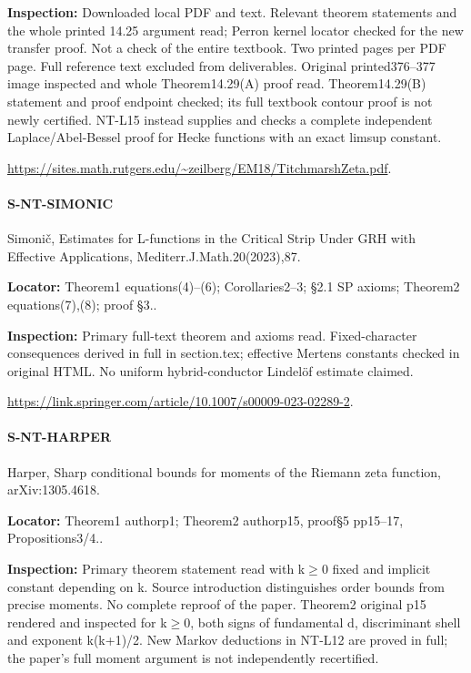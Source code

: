 \documentclass[11pt,a4paper]{article}
\begin{document}
\textbf{Inspection:} Downloaded local PDF and text.\allowbreak{} Relevant theorem statements and the whole printed 14.\allowbreak{}25 argument read; Perron kernel locator checked for the new transfer proof.\allowbreak{} Not a check of the entire textbook.\allowbreak{} Two printed pages per PDF page.\allowbreak{} Full reference text excluded from deliverables.\allowbreak{} Original printed376–\allowbreak{}377 image inspected and whole Theorem14.\allowbreak{}29(A) proof read.\allowbreak{} Theorem14.\allowbreak{}29(B) statement and proof endpoint checked; its full textbook contour proof is not newly certified.\allowbreak{} NT-L15 instead supplies and checks a complete independent Laplace/\allowbreak{}Abel-Bessel proof for Hecke functions with an exact limsup constant.\allowbreak{}

\url{https://sites.math.rutgers.edu/~zeilberg/EM18/TitchmarshZeta.pdf}.

\paragraph{S-NT-SIMONIC} Simonič, Estimates for L-functions in the Critical Strip Under GRH with Effective Applications, Mediterr.\allowbreak{}J.\allowbreak{}Math.\allowbreak{}20(2023),87.

\textbf{Locator:} Theorem1 equations(4)–\allowbreak{}(6); Corollaries2–\allowbreak{}3; §2.\allowbreak{}1 SP axioms; Theorem2 equations(7),(8); proof §3.\allowbreak{}.

\textbf{Inspection:} Primary full-text theorem and axioms read.\allowbreak{} Fixed-character consequences derived in full in section.\allowbreak{}tex; effective Mertens constants checked in original HTML.\allowbreak{} No uniform hybrid-conductor Lindelöf estimate claimed.\allowbreak{}

\url{https://link.springer.com/article/10.1007/s00009-023-02289-2}.

\paragraph{S-NT-HARPER} Harper, Sharp conditional bounds for moments of the Riemann zeta function, arXiv:\allowbreak{}1305.\allowbreak{}4618.

\textbf{Locator:} Theorem1 authorp1; Theorem2 authorp15, proof§5 pp15–\allowbreak{}17, Propositions3/\allowbreak{}4.\allowbreak{}.

\textbf{Inspection:} Primary theorem statement read with k\ensuremath{\ge}0 fixed and implicit constant depending on k.\allowbreak{} Source introduction distinguishes order bounds from precise moments.\allowbreak{} No complete reproof of the paper.\allowbreak{} Theorem2 original p15 rendered and inspected for k\ensuremath{\ge}0, both signs of fundamental d, discriminant shell and exponent k(k+1)/\allowbreak{}2.\allowbreak{} New Markov deductions in NT-L12 are proved in full; the paper’s full moment argument is not independently recertified.\allowbreak{}
\end{document}
